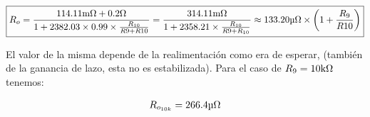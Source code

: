 \begin{equation}
\boxed{R_{o} = \frac{114.11 \si[per-mode=symbol]{\milli\ohm} + 0.2 \si[per-mode=symbol]{\ohm}}{1 + 2382.03 \times 0.99 \times \frac{R_{10}}{R{9} + R{10}}} = \frac{314.11 \si[per-mode=symbol]{\milli\ohm}}{1 + 2358.21 \times \frac{R_{10}}{R{9} + R_{10}}} \approx 133.20 \si[per-mode=symbol]{\micro\ohm} \times \left(  1 + \frac{R_{9}}{R{10}} \right) }
\end{equation}

El valor de la misma depende de la realimentación como era de esperar, (también de la ganancia de lazo, esta no es estabilizada). Para el caso de $R_{9} = 10 \si[per-mode=symbol]{\kilo\ohm}$ tenemos:

\begin{equation*}
R_{o_{10k}} = 266.4 \si[per-mode=symbol]{\micro\ohm}
\end{equation*}






